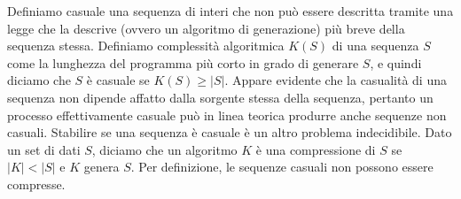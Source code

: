 \documentclass[a4paper,11pt]{article}
\begin{document}
\begin{enumerate}[resume]
	\noindent Definiamo casuale una sequenza di interi che non può essere descritta tramite una legge che la descrive (ovvero un algoritmo di generazione) più breve della sequenza stessa. Definiamo complessità algoritmica $K(S)$ di una sequenza $S$ come la lunghezza del programma più corto in grado di generare $S$, e quindi diciamo che $S$ è casuale se $K(S)\geq|S|$. Appare evidente che la casualità di una sequenza non dipende affatto dalla sorgente stessa della sequenza, pertanto un processo effettivamente casuale può in linea teorica produrre anche sequenze non casuali. Stabilire se una sequenza è casuale è un altro problema indecidibile. Dato un set di dati $S$, diciamo che un algoritmo $K$ è una compressione di $S$ se $|K|<|S|$ e $K$ genera $S$. Per definizione, le sequenze casuali non possono essere compresse.
\end{enumerate}
\end{document}
